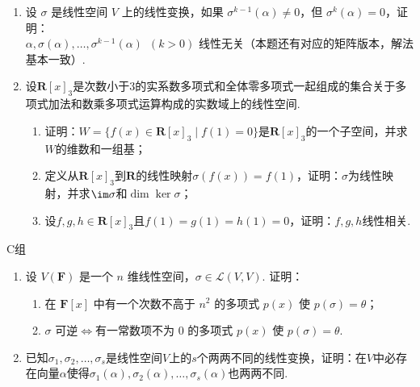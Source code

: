 \begin{enumerate}
    \item 设 $\sigma$ 是线性空间 $V$ 上的线性变换，如果 $\sigma^{k-1}(\alpha) \neq 0$，但 $\sigma^{k}(\alpha) = 0$，证明：\\
          $\alpha,\sigma(\alpha),\dots,\sigma^{k-1}(\alpha)\enspace(k>0)$ 线性无关（本题还有对应的矩阵版本，解法基本一致）.

    \item 设$\mathbf{R}[x]_3$是次数小于3的实系数多项式和全体零多项式一起组成的集合关于多项式加法和数乘多项式运算构成的实数域上的线性空间.
          \begin{enumerate}
              \item 证明：$W=\{f(x)\in \mathbf{R}[x]_3 \mid f(1)=0\}$是$\mathbf{R}[x]_3$的一个子空间，并求$W$的维数和一组基；

              \item 定义从$\mathbf{R}[x]_3$到$\mathbf{R}$的线性映射$\sigma(f(x))=f(1)$，证明：$\sigma$为线性映射，并求$\im\sigma$和$\dim\ker\sigma$；

              \item 设$f,g,h \in \mathbf{R}[x]_3$且$f(1)=g(1)=h(1)=0$，证明：$f,g,h$线性相关.
          \end{enumerate}
\end{enumerate}

\centerline{\heiti C组}
\begin{enumerate}
    \item 设 $V(\mathbf{F})$ 是一个 $n$ 维线性空间，$\sigma \in \mathcal{L}(V,V)$. 证明：
          \begin{enumerate}
              \item 在 $\mathbf{F}[x]$ 中有一个次数不高于 $n^2$ 的多项式 $p(x)$ 使 $p(\sigma) = \theta$；

              \item $\sigma$ 可逆$\iff$有一常数项不为 0 的多项式 $p(x)$ 使 $p(\sigma) = \theta$.
          \end{enumerate}

    \item 已知$\sigma_1,\sigma_2,\ldots,\sigma_s$是线性空间$V$上的$s$个两两不同的线性变换，证明：在$V$中必存在向量$\alpha$使得$\sigma_1(\alpha),\sigma_2(\alpha),\ldots,\sigma_s(\alpha)$也两两不同.
\end{enumerate}
